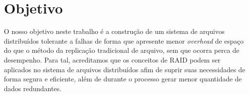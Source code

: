 
\section{Objetivo}

O nosso objetivo neste trabalho é a construção de um sistema de arquivos distribuídos tolerante a falhas de forma que apresente menor \textit{overhead} de espaço do que o método da replicação tradicional de arquivo, sem que ocorra perca de desempenho. Para tal, acreditamos que os conceitos de RAID podem ser aplicados no sistema de arquivos distribuídos afim de suprir suas necessidades de forma segura e eficiente, além de durante o processo gerar menor quantidade de dados redundantes.
\\










